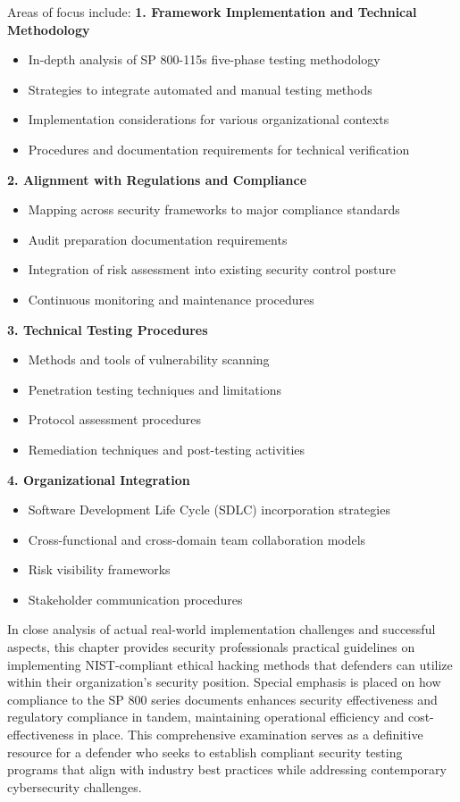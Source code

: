 Areas of focus include:
\textbf{1. Framework Implementation and Technical Methodology}
\begin{itemize}
    \item In-depth analysis of SP 800-115s five-phase testing methodology
    \item Strategies to integrate automated and manual testing methods
    \item Implementation considerations for various organizational contexts
    \item Procedures and documentation requirements for technical verification
\end{itemize}
\textbf{2. Alignment with Regulations and Compliance}
\begin{itemize}
    \item Mapping across security frameworks to major compliance standards
    \item Audit preparation documentation requirements
    \item Integration of risk assessment into existing security control posture
    \item Continuous monitoring and maintenance procedures
\end{itemize}
\textbf{3. Technical Testing Procedures}
\begin{itemize}
    \item Methods and tools of vulnerability scanning
    \item Penetration testing techniques and limitations
    \item Protocol assessment procedures
    \item Remediation techniques and post-testing activities
\end{itemize}
\textbf{4. Organizational Integration}
\begin{itemize}
    \item Software Development Life Cycle (SDLC) incorporation strategies
    \item Cross-functional and cross-domain team collaboration models
    \item Risk visibility frameworks
    \item Stakeholder communication procedures
\end{itemize}
In close analysis of actual real-world implementation challenges and successful aspects, this chapter provides security professionals practical guidelines on implementing NIST-compliant ethical hacking methods that defenders can utilize within their organization's security position. Special emphasis is placed on how compliance to the SP 800 series documents enhances security effectiveness and regulatory compliance in tandem, maintaining operational efficiency and cost-effectiveness in place. This comprehensive examination serves as a definitive resource for a defender who seeks to establish compliant security testing programs that align with industry best practices while addressing contemporary cybersecurity challenges.

